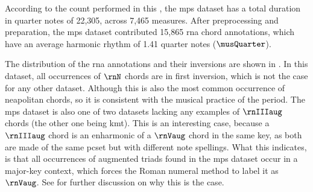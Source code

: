 
According to the count performed in this \thesisdiss{}, the
\gls{mps} dataset has a total duration in quarter notes of
22,305, across 7,465 measures. After preprocessing and
preparation, the \gls{mps} dataset contributed 15,865
\gls{rna} chord annotations, which have an average harmonic
rhythm of 1.41 quarter notes ($\musQuarter$).

The distribution of the \gls{rna} annotations and their
inversions are shown in . In this
dataset, all occurrences of $\rnN$ chords are in first
inversion, which is not the case for any other dataset.
Although this is also the most common occurrence of
\gls{neapolitan} chords, so it is consistent with the
musical practice of the period. The \gls{mps} dataset is
also one of two datasets lacking any examples of $\rnIIIaug$
chords (the other one being \gls{kmt}). This is an
interesting case, because a $\rnIIIaug$ chord is an
enharmonic of a $\rnVaug$ chord in the same key, as both are
made of the same \gls{pcset} but with different note
spellings. What this indicates, is that all occurrences of
augmented triads found in the \gls{mps} dataset occur in a
major-key context, which forces the Roman numeral method to
label it as $\rnVaug$. See
 for
further discussion on why this is the case.


